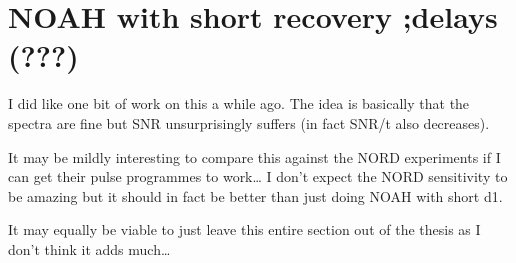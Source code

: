 \section{NOAH with short recovery ;delays (???)}
\label{sec:noah__shortd1}

I did like one bit of work on this a while ago.
The idea is basically that the spectra are fine but SNR unsurprisingly suffers (in fact SNR/t also decreases).

It may be mildly interesting to compare this against the NORD experiments if I can get their pulse programmes to work\ldots{} I don't expect the NORD sensitivity to be amazing but it should in fact be better than just doing NOAH with short d1.

It may equally be viable to just leave this entire section out of the thesis as I don't think it adds much\ldots{}
